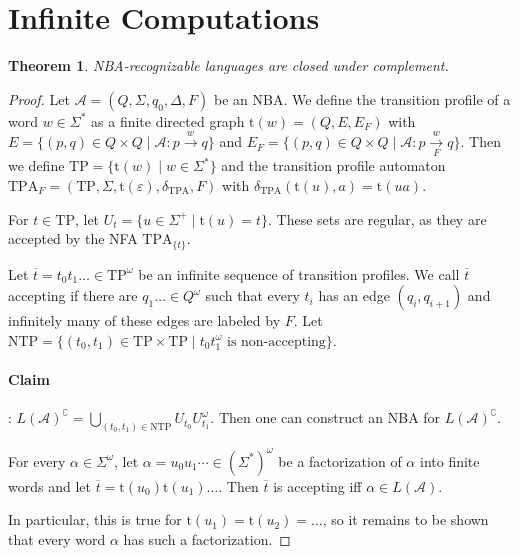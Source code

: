 \documentclass{article}
\newtheorem{theorem}{Theorem}
\begin{document}
\section{Infinite Computations}
\begin{theorem}
\label{nba_complement}
	NBA-recognizable languages are closed under complement.
\end{theorem}
\begin{proof}
	Let $\mathcal{A} = (Q, \Sigma, q_0, \Delta, F)$ be an NBA. We define the transition profile of a word $w \in \Sigma^*$ as a finite directed graph $\text{t}(w) = (Q, E, E_F)$ with $E = \{ (p, q) \in Q \times Q \mid \mathcal{A} : p \overset{w}{\rightarrow} q \}$ and $E_F = \{ (p, q) \in Q \times Q \mid \mathcal{A} : p \underset{F}{\overset{w}{\rightarrow}} q \}$. Then we define $\text{TP} = \{ \text{t}(w) \mid w \in \Sigma^* \}$ and the transition profile automaton $\text{TPA}_F = (\text{TP}, \Sigma, \text{t}(\varepsilon), \delta_\text{TPA}, F)$ with $\delta_\text{TPA}(\text{t}(u), a) = \text{t}(ua)$.
	
	For $t \in \text{TP}$, let $U_t = \{ u \in \Sigma^+ \mid \text{t}(u) = t\}$. These sets are regular, as they are accepted by the NFA $\text{TPA}_{\{t\}}$.
	
	Let $\overline{t} = t_0 t_1 \dots \in \text{TP}^\omega$ be an infinite sequence of transition profiles. We call $\overline{t}$ accepting if there are $q_1 \dots \in Q^\omega$ such that every $t_i$ has an edge $(q_i, q_{i+1})$ and infinitely many of these edges are labeled by $F$. Let $\text{NTP} = \{ (t_0, t_1) \in \text{TP} \times \text{TP} \mid t_0 t_1^\omega \text{ is non-accepting} \}$.
	
	\paragraph{Claim}: $L(\mathcal{A})^\complement = \bigcup\limits_{(t_0, t_1) \in \text{NTP}} U_{t_0} U_{t_1}^\omega$. Then one can construct an NBA for $L(\mathcal{A})^\complement$.
	
	For every $\alpha \in \Sigma^\omega$, let $\alpha = u_0 u_1 \cdots \in (\Sigma^*)^\omega$ be a factorization of $\alpha$ into finite words and let $\overline{t} = \text{t}(u_0) \text{t}(u_1) \dots$. Then $\overline{t}$ is accepting iff $\alpha \in L(\mathcal{A})$.
	
	In particular, this is true for $\text{t}(u_1) = \text{t}(u_2) = \dots$, so it remains to be shown that every word $\alpha$ has such a factorization.
	

\end{proof}
\end{document}

